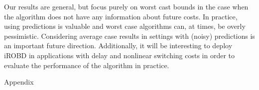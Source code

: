 \documentclass[11pt]{article}
\theoremstyle{definition}
\begin{document}
Our results are general, but focus purely on worst cast bounds in the case when the algorithm does not have any information about future costs.  In practice, using predictions is valuable and worst case algorithms can, at times, be overly pessimistic.  Considering average case results in settings with (noisy) predictions is an important future direction.  Additionally, it will be interesting to deploy iROBD in applications with delay and nonlinear switching costs in order to evaluate the performance of the algorithm in practice.  




% 

\newpage
\appendix

\begin{center}
{\huge Appendix}
\end{center}


\appendix


\end{document}
